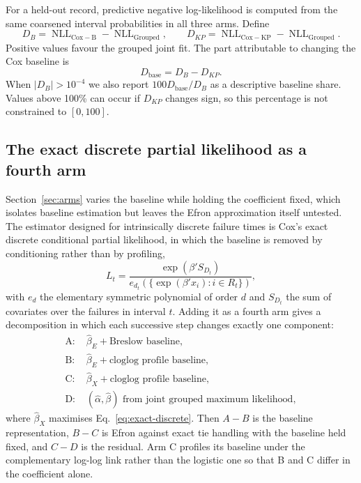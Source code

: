 \documentclass[smallextended,natbib]{svjour3}
\begin{document}
For a held-out record, predictive negative log-likelihood is computed from the same coarsened interval probabilities in all three arms. Define
\begin{equation}
D_B=\operatorname{NLL}_{\mathrm{Cox-B}}-\operatorname{NLL}_{\mathrm{Grouped}},
\qquad
D_{KP}=\operatorname{NLL}_{\mathrm{Cox-KP}}-\operatorname{NLL}_{\mathrm{Grouped}}.
\label{eq:d-definitions}
\end{equation}
Positive values favour the grouped joint fit. The part attributable to changing the Cox baseline is
\begin{equation}
D_{\mathrm{base}}=D_B-D_{KP}.
\label{eq:baseline-component}
\end{equation}
When $|D_B|>10^{-4}$ we also report $100D_{\mathrm{base}}/D_B$ as a descriptive baseline share. Values above 100\% can occur if $D_{KP}$ changes sign, so this percentage is not constrained to $[0,100]$.

\subsection{The exact discrete partial likelihood as a fourth arm}
\label{sec:arm-exact}

Section~\ref{sec:arms} varies the baseline while holding the coefficient fixed, which isolates baseline estimation but leaves the Efron approximation itself untested. The estimator designed for intrinsically discrete failure times is Cox's exact discrete conditional partial likelihood, in which the baseline is removed by conditioning rather than by profiling,
\begin{equation}
L_t=\frac{\exp(\beta'S_{D_t})}{e_{d_t}\!\left(\{\exp(\beta'x_i):i\in R_t\}\right)},
\label{eq:exact-discrete}
\end{equation}
with $e_{d}$ the elementary symmetric polynomial of order $d$ and $S_{D_t}$ the sum of covariates over the failures in interval $t$. Adding it as a fourth arm gives a decomposition in which each successive step changes exactly one component:
\begin{equation}
\begin{split}
\text{A: }&\widehat\beta_E+\text{Breslow baseline},\\
\text{B: }&\widehat\beta_E+\text{cloglog profile baseline},\\
\text{C: }&\widehat\beta_X+\text{cloglog profile baseline},\\
\text{D: }&(\widehat\alpha,\widehat\beta)\text{ from joint grouped maximum likelihood},
\end{split}
\label{eq:four-arms}
\end{equation}
where $\widehat\beta_X$ maximises Eq.~\eqref{eq:exact-discrete}. Then $A-B$ is the baseline representation, $B-C$ is Efron against exact tie handling with the baseline held fixed, and $C-D$ is the residual. Arm C profiles its baseline under the complementary log-log link rather than the logistic one so that B and C differ in the coefficient alone.
\end{document}
